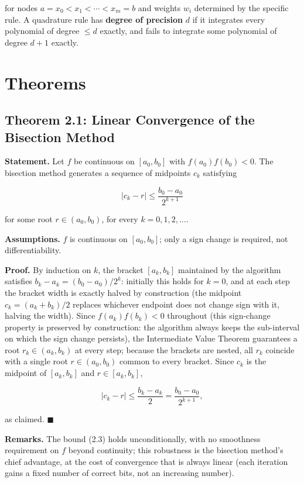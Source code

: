 \documentclass[
]{article}
\begin{document}
for nodes \(a=x_0<x_1<\cdots<x_m=b\) and weights \(w_i\) determined by
the specific rule. A quadrature rule has \textbf{degree of precision}
\(d\) if it integrates every polynomial of degree \(\le d\) exactly, and
fails to integrate some polynomial of degree \(d+1\) exactly.

\section{Theorems}\label{theorems}

\subsection{Theorem 2.1: Linear Convergence of the Bisection
Method}\label{theorem-2.1-linear-convergence-of-the-bisection-method}

\textbf{Statement.} Let \(f\) be continuous on \([a_0,b_0]\) with
\(f(a_0)f(b_0)<0\). The bisection method generates a sequence of
midpoints \(c_k\) satisfying

\[
|c_k - r| \le \frac{b_0-a_0}{2^{k+1}}
\tag{2.3}
\]

for some root \(r\in(a_0,b_0)\), for every \(k=0,1,2,\dots\).

\textbf{Assumptions.} \(f\) is continuous on \([a_0,b_0]\); only a sign
change is required, not differentiability.

\textbf{Proof.} By induction on \(k\), the bracket \([a_k,b_k]\)
maintained by the algorithm satisfies \(b_k-a_k = (b_0-a_0)/2^k\):
initially this holds for \(k=0\), and at each step the bracket width is
exactly halved by construction (the midpoint \(c_k=(a_k+b_k)/2\)
replaces whichever endpoint does not change sign with it, halving the
width). Since \(f(a_k)f(b_k)<0\) throughout (this sign-change property
is preserved by construction: the algorithm always keeps the
sub-interval on which the sign change persists), the Intermediate Value
Theorem guarantees a root \(r_k \in (a_k,b_k)\) at every step; because
the brackets are nested, all \(r_k\) coincide with a single root
\(r \in (a_0,b_0)\) common to every bracket. Since \(c_k\) is the
midpoint of \([a_k,b_k]\) and \(r\in[a_k,b_k]\),

\[
|c_k-r| \le \frac{b_k-a_k}{2} = \frac{b_0-a_0}{2^{k+1}},
\]

as claimed. \(\blacksquare\)

\textbf{Remarks.} The bound (2.3) holds unconditionally, with no
smoothness requirement on \(f\) beyond continuity; this robustness is
the bisection method's chief advantage, at the cost of convergence that
is always linear (each iteration gains a fixed number of correct bits,
not an increasing number).
\end{document}
